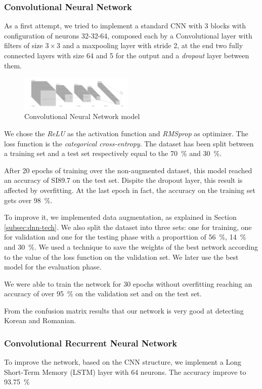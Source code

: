 \documentclass{article}
\begin{document}
\subsubsection{Convolutional Neural Network}
As a first attempt, we tried to implement a standard CNN with 3 blocks with configuration of neurons 32-32-64, composed each by a Convolutional layer with filters of size $3\times 3$ and a maxpooling layer with stride 2, at the end two fully connected layers with size 64 and 5 for the output and a \emph{dropout} layer between them.
\begin{figure}[h]
    \centering
    \includegraphics[width=0.48\textwidth]{img/cnn_figure.PNG}
    \caption{Convolutional Neural Network model}
    \label{fig:CNN model}
\end{figure}

We chose the \emph{ReLU} as the activation function and \emph{RMSprop} as optimizer. The loss function is the \emph{categorical cross-entropy}. The dataset has been split between a training set and a test set respectively equal to the \SI{70}{\percent} and \SI{30}{\percent}.

After 20 epochs of training over the non-augmented dataset, this model reached an accuracy of SI{89.7}{\percent} on the test set.
Dispite the dropout layer, this result is affected by overfitting. At the last epoch in fact, the accuracy on the training set gets over \SI{98}{\percent}.

To improve it, we implemented data augmentation, as explained in Section \ref{subsec:dnn-tech}. We also split the dataset into three sets: one for training, one for validation and one for the testing phase with a proporttion of \SI{56}{\percent}, \SI{14}{\percent}  and \SI{30}{\percent}. We used a technique to save the weights of the best network according to the value of the loss function on the validation set. We later use the best model for the evaluation phase.

We were able to train the network for 30 epochs without overfitting reaching an accuracy of over \SI{95}{\percent} on the validation set and  on the test set.

From the confusion matrix results that our network is very good at detecting Korean and Romanian.

\subsubsection{Convolutional Recurrent Neural Network}
To improve the network, based on the CNN structure, we implement a Long Short-Term Memory (LSTM) layer with 64 neurons. The accuracy improve to \SI{93.75}{\percent}
\end{document}

